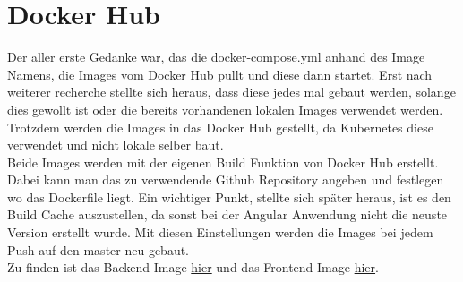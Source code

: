 \section{Docker Hub}
Der aller erste Gedanke war, das die docker-compose.yml anhand des Image Namens, die Images vom Docker Hub pullt und diese dann startet. Erst nach weiterer recherche stellte sich heraus, dass diese jedes mal gebaut werden, solange dies gewollt ist oder die bereits vorhandenen lokalen Images verwendet werden.\\
Trotzdem werden die Images in das Docker Hub gestellt, da Kubernetes diese verwendet und nicht lokale selber baut.\\
Beide Images werden mit der eigenen Build Funktion von Docker Hub erstellt. Dabei kann man das zu verwendende Github Repository angeben und festlegen wo das Dockerfile liegt. Ein wichtiger Punkt, stellte sich später heraus, ist es den Build Cache auszustellen, da sonst bei der Angular Anwendung nicht die neuste Version erstellt wurde.
Mit diesen Einstellungen werden die Images bei jedem Push auf den master neu gebaut.\\
Zu finden ist das Backend Image \hyperlink{https://hub.docker.com/repository/docker/drinkler/microservices-backend/general}{hier} und das Frontend Image \hyperlink{https://hub.docker.com/repository/docker/drinkler/microservices-frontend}{hier}.